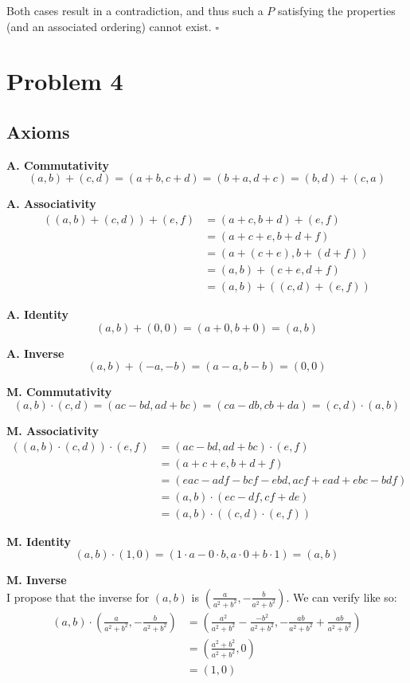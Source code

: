 \documentclass[12pt]{article}
\begin{document}
Both cases result in a contradiction, and thus
such a $P$ satisfying the properties (and an associated ordering)
cannot exist. $\square$

\pagebreak

\section{Problem 4}

\subsection{Axioms}

\textbf{A. Commutativity}
\[(a,b)+(c,d)=(a+b,c+d)=(b+a,d+c)=(b,d)+(c,a)\]

\textbf{A. Associativity}
\begin{align*}
      ((a,b)+(c,d))+(e,f)
       & = (a+c,b+d)+(e,f)     \\
       & = (a+c+e,b+d+f)       \\
       & = (a+(c+e),b+(d+f))   \\
       & = (a,b)+(c+e,d+f)     \\
       & = (a,b)+((c,d)+(e,f))
\end{align*}

\textbf{A. Identity}
\[(a,b)+(0,0)=(a+0,b+0)=(a,b)\]

\textbf{A. Inverse}
\[(a,b)+(-a,-b)=(a-a,b-b)=(0,0)\]

\textbf{M. Commutativity}
\[(a,b)\cdot(c,d)=(ac-bd,ad+bc)=(ca-db,cb+da)=(c,d)\cdot(a,b)\]

\textbf{M. Associativity}
\begin{align*}
      ((a,b)\cdot(c,d))\cdot(e,f)
       & = (ac-bd,ad+bc)\cdot(e,f)           \\
       & = (a+c+e,b+d+f)                     \\
       & = (eac-adf-bcf-ebd,acf+ead+ebc-bdf) \\
       & = (a,b)\cdot(ec-df,cf+de)           \\
       & = (a,b)\cdot((c,d)\cdot(e,f))
\end{align*}

\textbf{M. Identity}
\[(a,b)\cdot(1,0)=(1 \cdot a - 0 \cdot b, a \cdot 0 + b \cdot 1)=(a,b)\]

\textbf{M. Inverse} \\
I propose that the inverse for $(a, b)$ is $\left(\frac{a}{a^2+b^2},-\frac{b}{a^2+b^2}\right)$.
We can verify like so:
\begin{align*}
      (a,b) \cdot \left(\frac{a}{a^2+b^2},-\frac{b}{a^2+b^2}\right)
       & = \left(\frac{a^2}{a^2+b^2}-\frac{-b^2}{a^2+b^2}, -\frac{ab}{a^2+b^2}+\frac{ab}{a^2+b^2}\right) \\
       & = \left(\frac{a^2+b^2}{a^2+b^2}, 0\right)                                                       \\
       & = (1, 0)
\end{align*}
\end{document}
